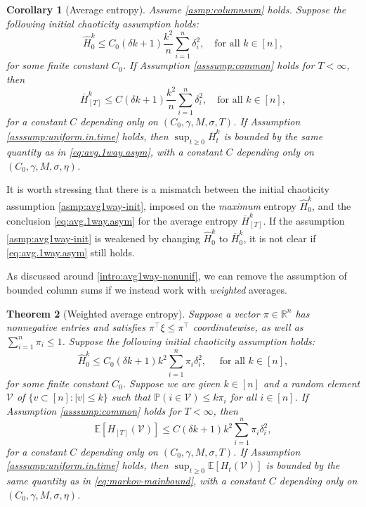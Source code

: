 \documentclass[11pt,reqno]{amsart}
\numberwithin{equation}{section}
\newtheorem{theorem}{Theorem}[section]
\newtheorem{corollary}[theorem]{Corollary}
\theoremstyle{definition}
\def\E{{\mathbb E}}
\def\PP{{\mathbb P}}
\def\R{{\mathbb R}}
\def\V{{\mathcal V}}
\begin{document}
\begin{corollary}[Average entropy] \label{co:avg.1way} 
Assume \eqref{asmp:columnsum} holds.
Suppose the following initial chaoticity assumption holds: 
	\begin{equation} 
		 \widehat{H}^k_0 \leq C_0 (\delta k + 1)  \frac{k^2 }{n} \sum_{i=1}^n\delta_i^2 , \quad \text{for all } k \in [n], \label{asmp:avg1way-init}
	\end{equation}
	for some finite constant $C_0$.
	If Assumption \ref{asssump:common} holds for $T < \infty$, then 
\begin{equation}  \label{eq:avg.1way.asym}
\overline{H}^{k}_{[T]} \leq C(\delta k + 1)\frac{k^2 }{n} \sum_{i=1}^n\delta_i^2 , \quad \text{for all } k \in [n],  
\end{equation}
for a constant  $C$ depending only on $(C_0, \gamma, M,\sigma, T)$. 
If Assumption \ref{asssump:uniform.in.time} holds, then $\sup_{t \ge 0}\overline{H}^{k}_t$ is bounded by the same quantity as in \eqref{eq:avg.1way.asym}, with a constant  $C$ depending only on $(C_0, \gamma, M,\sigma, \eta)$.  
\end{corollary}

It is worth stressing that there is a mismatch between the initial chaoticity assumption \eqref{asmp:avg1way-init}, imposed on the \emph{maximum} entropy $\widehat{H}^k_0$, and the conclusion \eqref{eq:avg.1way.asym} for the average entropy $\overline{H}^k_{[T]}$.
If the assumption \eqref{asmp:avg1way-init} is weakened by changing $\widehat{H}^k_0$ to $\overline{H}^k_0$, it is not clear if \eqref{eq:avg.1way.asym} still holds.


As discussed around \eqref{intro:avg1way-nonunif}, we can remove the assumption of bounded column sums if we instead work with \emph{weighted} averages. 

\begin{theorem}[Weighted average entropy] \label{theorem:avg-markov}
Suppose a vector $\pi \in \R^n$ has nonnegative entries and satisfies $\pi^\top\xi \le \pi^\top$ coordinatewise, as well as $\sum_{i=1}^n\pi_i \le 1$. 
Suppose the following initial chaoticity assumption holds: 
\begin{equation} \label{asmp:initial-markov}
\widehat{H}^k_0 \le C_0( \delta k + 1) k^2 \sum_{i=1}^n \pi_i  \delta_i^2 , \quad \text{ for all } k \in [n],
\end{equation}
for some finite constant $C_0$.
Suppose we are given $k \in [n]$ and a random element $\V$ of $\{v \subset [n] : |v| \le k\}$ such that $\PP(i \in \V) \le k\pi_i$ for all $i \in [n]$. 
If Assumption \ref{asssump:common} holds for $T < \infty$, then
\begin{equation} \label{eq:markov-mainbound}
\E[H_{[T]}(\V)] \le C(\delta k + 1)k^2 \sum_{i=1}^n \pi_i  \delta_i^2 ,
\end{equation}
for a constant  $C$ depending only on $(C_0, \gamma, M,\sigma, T)$. 
If Assumption \ref{asssump:uniform.in.time} holds, then  $\sup_{t \ge 0}\E[H_t(\V)]$ is bounded by the same quantity as in \eqref{eq:markov-mainbound}, with a constant  $C$ depending only on $(C_0, \gamma, M,\sigma, \eta)$. 
\end{theorem} 
\end{document}
